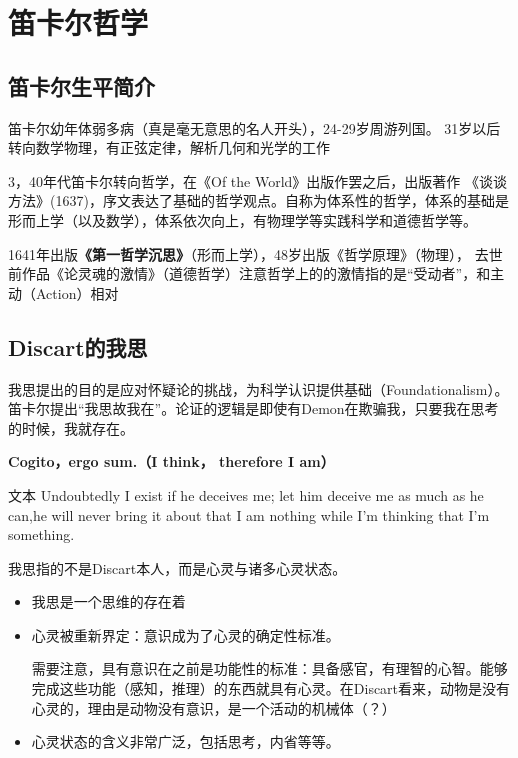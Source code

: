 \section{笛卡尔哲学}

\subsection{笛卡尔生平简介}

笛卡尔幼年体弱多病（真是毫无意思的名人开头），24-29岁周游列国。
31岁以后转向数学物理，有正弦定律，解析几何和光学的工作

3，40年代笛卡尔转向哲学，在《Of the World》出版作罢之后，出版著作
《谈谈方法》(1637)，序文表达了基础的哲学观点。自称为体系性的哲学，体系的基础是
形而上学（以及数学），体系依次向上，有物理学等实践科学和道德哲学等。

1641年出版\textbf{《第一哲学沉思》}（形而上学），48岁出版《哲学原理》（物理），
去世前作品《论灵魂的激情》（道德哲学）注意哲学上的的激情指的是“受动者”，和主动（Action）相对

\subsection{Discart的我思}

我思提出的目的是应对怀疑论的挑战，为科学认识提供基础（Foundationalism）。笛卡尔提出“我思故我在”。论证的逻辑是即使有Demon在欺骗我，只要我在思考的时候，我就存在。

\textbf{Cogito，ergo sum.（I think， therefore I am）}

\begin{fancybox}{文本}
    Undoubtedly I exist if he deceives me; let him deceive me as much as he can,he will never bring it about that I am nothing while I'm thinking that I'm something. 
\end{fancybox}

我思指的不是Discart本人，而是心灵与诸多心灵状态。

\begin{itemize}
    \item 我思是一个思维的存在着
    \item 心灵被重新界定：意识成为了心灵的确定性标准。
    
    需要注意，具有意识在之前是功能性的标准：具备感官，有理智的心智。能够完成这些功能（感知，推理）的东西就具有心灵。在Discart看来，动物是没有心灵的，理由是动物没有意识，是一个活动的机械体（？）
    \item 心灵状态的含义非常广泛，包括思考，内省等等。
\end{itemize}

